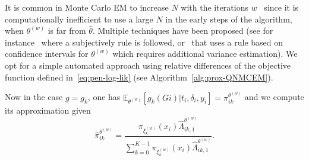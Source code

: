\documentclass[11pt]{article}
\newcommand{\E}{\mathds E}
\begin{document}
It is common in Monte Carlo EM to increase $N$ with the iterations $w$~\citep{wei1990monte} since it is computationally inefficient to use a large $N$ in the early steps of the algorithm, when $\theta^{(w)}$ is far from $\hat \theta$. Multiple techniques have been proposed (see for instance~\citet{law2002joint} where a subjectively rule is followed, or~\citet{booth1999maximizing} that uses a rule based on confidence intervals for $\theta^{(w)}$ which requires additional variance estimation). We opt for a simple automated approach using relative differences of the objective function defined in~\eqref{eq:pen-log-lik} (see Algorithm~\ref{alg:prox-QNMCEM}).

Now in the case $g = g_k$, one has $\E_{\theta^{(w)}}[g_k(Gi) | t_i, \delta_i, y_i] = \pi_{ik}^{\theta^{(w)}}$ and we compute its approximation given
\begin{equation}
\label{eq:hat_pi_ik-def}
  \hat \pi_{ik}^{\theta^{(w)}} = \dfrac{\pi_{\xi_k^{(w)}}(x_i) \hat \Lambda_{ik,1}^{\theta^{(w)}}}{\sum_{k=0}^{K-1} \pi_{\xi_k^{(w)}}(x_i) \hat \Lambda_{ik,1}^{\theta^{(w)}}}.
\end{equation}
\end{document}
